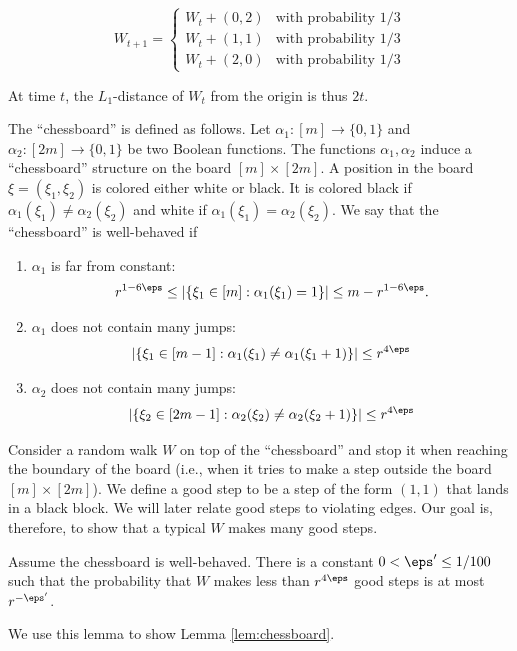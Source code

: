 \documentclass{article}
\begin{document}
\[
W_{t+1} = \begin{cases}
     W_t + (0,2) &\text{with probability $1/3$}\\
     W_t + (1,1) &\text{with probability $1/3$}\\
     W_t + (2,0) &\text{with probability $1/3$}
\end{cases}
\]

At time $t$, the $L_1$-distance of $W_t$ from the origin is thus $2t$.

The “chessboard” is defined as follows. Let $\alpha_1 : [m] \rightarrow \{0, 1\}$ and $\alpha_2 : [2m] \rightarrow \{0, 1\}$ be two
Boolean functions. The functions $\alpha_1, \alpha_2$ induce a “chessboard” structure on the board $[m] \times [2m]$.
A position in the board $\xi = (\xi_1, \xi_2)$ is colored either white or black. It is colored black if $\alpha_1(\xi_1) \neq
\alpha_2(\xi_2)$ and white if $\alpha_1(\xi_1) = \alpha_2(\xi_2)$. We say that the “chessboard” is well-behaved if

\begin{enumerate}
    \item $\alpha_1$ is far from constant:
    \[
r^{1-6\eps} \leq
|\{\xi_1 \in [m] : \alpha_1(\xi_1) = 1\}|  \leq m - r^{1-6\eps}.
    \]
    \item $\alpha_1$ does not contain many jumps:
    \[
|\{\xi_1 \in [m - 1] : \alpha_1(\xi_1) \neq \alpha_1(\xi_1 + 1)\}|\leq r^{4\eps}
    \]
    \item $\alpha_2$ does not contain many jumps:
   \[
|\{\xi_2 \in [2m - 1] : \alpha_2(\xi_2) \neq \alpha_2(\xi_2 + 1)\}|\leq r^{4\eps}
    \]
\end{enumerate}

Consider a random walk $W$ on top of the “chessboard” and stop it when reaching the boundary
of the board (i.e., when it tries to make a step outside the board $[m] \times [2m]$). We define a good
step to be a step of the form $(1, 1)$ that lands in a black block. We will later relate good steps to
violating edges. Our goal is, therefore, to show that a typical $W$ makes many good steps.

\begin{lem}\label{lem:good-steps}
    Assume the chessboard is well-behaved. There is a constant $0<\eps'\leq 1/100$ such that the probability that $W$ makes less than $r^{4\eps}$
good steps is at most $r^{-\eps'}$.
\end{lem}

We use this lemma to show Lemma \ref{lem:chessboard}.
\end{document}
